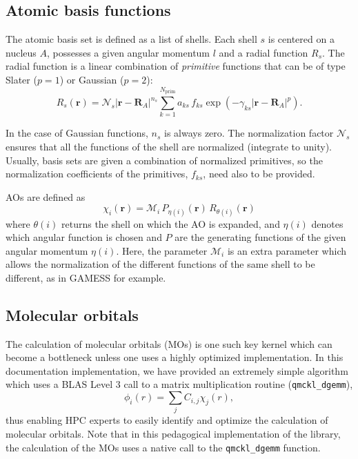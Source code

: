 \subsection{Atomic basis functions}

The atomic basis set is defined as a list of shells. Each shell $s$ is
centered on a nucleus $A$, possesses a given angular momentum $l$ and a
radial function $R_s$. The radial function is a linear combination of
\emph{primitive} functions that can be of type Slater ($p=1$)  or
Gaussian ($p=2$):
\[
  R_s(\mathbf{r}) = \mathcal{N}_s |\mathbf{r}-\mathbf{R}_A|^{n_s}
  \sum_{k=1}^{N_{\text{prim}}} a_{ks}\, f_{ks}
 \exp \left( - \gamma_{ks} | \mathbf{r}-\mathbf{R}_A | ^p \right).
\]

In the case of Gaussian functions, $n_s$ is always zero.  The
normalization factor $\mathcal{N}_s$ ensures that all the functions of
the shell are normalized (integrate to unity). Usually, basis sets are
given a combination of normalized primitives, so the normalization
coefficients of the primitives, $f_{ks}$, need also to be provided.

\acp{AO} are defined as
\[
\chi_i (\mathbf{r}) = \mathcal{M}_i\, P_{\eta(i)}(\mathbf{r})\, R_{\theta(i)} (\mathbf{r})
\] 
where $\theta(i)$ returns the shell on which the \ac{AO} is expanded, and
$\eta(i)$ denotes which angular function is chosen and $P$ are the
generating functions of the given angular momentum $\eta(i)$.  Here,
the parameter $\mathcal{M}_i$ is an extra parameter which allows the
normalization of the different functions of the same shell to be
different, as in GAMESS for example.


\subsection{Molecular orbitals}

The calculation of molecular orbitals (MOs) is one such key kernel which can
become a bottleneck unless one uses a highly optimized implementation.
In this documentation implementation, we have provided an extremely simple
algorithm which uses a \ac{BLAS} Level 3 call to a matrix multiplication
routine (\texttt{qmckl_dgemm}),
\[
  \phi_i(r) = \sum_{j}C_{i,j}\chi_j(r),
    \label{eq:mos}
\]
thus enabling \ac{HPC} experts to easily identify and optimize the calculation
of molecular orbitals. Note that in this pedagogical implementation of the
library, the calculation of the \acp{MO} uses a native call to the
\texttt{qmckl_dgemm} function.

